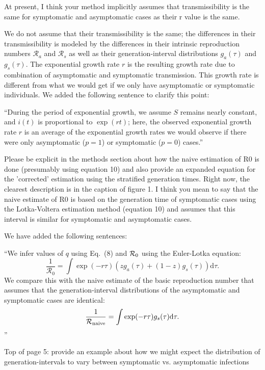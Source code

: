 \documentclass[12pt]{article}
\newcommand{\revtext}{\textsf}
\begin{document}
\revtext{At present, I think your method implicitly assumes that transmissibility is the same for symptomatic and asymptomatic cases as their r value is the same.}

We do not assume that their transmissibility is the same; the differences in their transmissibility is modeled by the differences in their intrinsic reproduction numbers $\mathcal R_a$ and $\mathcal R_s$ as well as their generation-interval distributions $g_a(\tau)$ and $g_s(\tau)$. The exponential growth rate $r$ is the resulting growth rate due to combination of asymptomatic and symptomatic transmission. This growth rate is different from what we would get if we only have asymptomatic or symptomatic individuals. We added the following sentence to clarify this point:

``During the period of exponential growth, we assume $S$ remains nearly constant, and $i(t)$ is proportional to $\exp(r t)$;
here, the observed exponential growth rate $r$ is an average of the exponential growth rates we would observe if there were only asymptomatic ($p=1$) or symptomatic ($p=0$) cases.''

\revtext{Please be explicit in the methods section about how the naive estimation of R0 is done (presumably using equation 10) and also provide an expanded equation for the 'corrected' estimation using the stratified generation times. Right now, the clearest description is in the caption of figure 1.  I think you mean to say that the naive estimate of R0 is based on the generation time of symptomatic cases using the Lotka-Voltera estimation method (equation 10) and assumes that this interval is similar for symptomatic and asymptomatic cases.}

We have added the following sentences:

``We infer values of $q$ using Eq.~(8) and ${\cal{R}}_0$ using the Euler-Lotka equation:
\begin{equation}
\frac{1}{\mathcal R_0} = \int \exp(-r \tau) \left(z g_a(\tau) + (1-z) g_s(\tau)\right) \mathrm{d} \tau.
\end{equation}
We compare this with the naive estimate of the basic reproduction number that assumes that the generation-interval distributions of the asymptomatic and symptomatic cases are identical:
\begin{equation}
\frac{1}{\mathcal R_{\tiny \textrm{naive}}} = \int \exp(-r \tau) g_s(\tau) \mathrm{d} \tau.
\end{equation}''

\revtext{Top of page 5: provide an example about how we might expect the distribution of generation-intervals to vary between symptomatic vs. asymptomatic infections}
\end{document}

